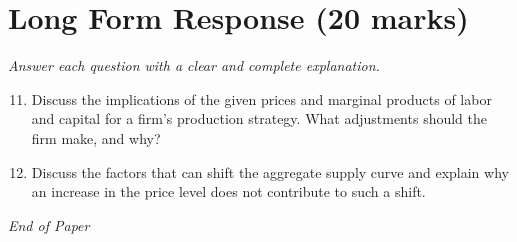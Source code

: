 \documentclass[12pt]{article}
\begin{document}
\section*{Long Form Response (20 marks)}
\textit{Answer each question with a clear and complete explanation.}
\begin{enumerate}[label=\arabic*.]
\setcounter{enumi}{10}
\item Discuss the implications of the given prices and marginal products of labor and capital for a firm's production strategy. What adjustments should the firm make, and why?
\item Discuss the factors that can shift the aggregate supply curve and explain why an increase in the price level does not contribute to such a shift.
\end{enumerate}

\vfill
\noindent\textit{End of Paper}
\end{document}
